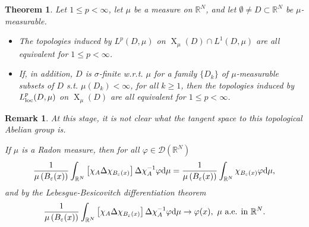 \documentclass{book}
\numberwithin{equation}{section}
\newtheorem{theorem}{Theorem}[section]
\newtheorem{remark}{Remark}[section]
\begin{document}
\begin{enumerate}
    \begin{theorem}
        Let $1\le p < \infty$, let $\mu$ be a measure on $\mathbb{R}^N$, and let $\emptyset\ne D\subset\mathbb{R}^N$ be $\mu$-measurable.
        \begin{itemize}
            \item[(i)] The topologies induced by $L^p(D,\mu)$ on $\operatorname{X}_\mu(D)\cap L^1(D,\mu)$ are all equivalent for $1\le p < \infty$.
            \item[(ii)] If, in addition, $D$ is $\sigma$-finite w.r.t. $\mu$ for a family $\{D_k\}$ of $\mu$-measurable subsets of $D$ s.t. $\mu(D_k) < \infty$, for all $k\ge 1$, then the topologies induced by $L_{\rm loc}^p(D,\mu)$ on $\operatorname{X}_\mu(D)$ are all equivalent for $1\le p < \infty$.
        \end{itemize}
    \end{theorem}

    \begin{remark}
        At this stage, it is not clear what the tangent space to this topological Abelian group is.
        
        If $\mu$ is a Radon measure, then for all $\varphi\in\mathcal{D}(\mathbb{R}^N)$
        \begin{align*}
            \frac{1}{\mu\left(B_\varepsilon(x)\right)}\int_{\mathbb{R}^N} \left[\chi_A\Delta\chi_{B_\varepsilon(x)}\right]\Delta\chi_A^{-1}\varphi{\rm d}\mu = \frac{1}{\mu\left(B_\varepsilon(x)\right)}\int_{\mathbb{R}^N} \chi_{B_\varepsilon(x)}\varphi{\rm d}\mu,
        \end{align*}
        and by the Lebesgue-Besicovitch differentiation theorem
        \begin{align*}
            \frac{1}{\mu\left(B_\varepsilon(x)\right)}\int_{\mathbb{R}^N} \left[\chi_A\Delta\chi_{B_\varepsilon(x)}\right]\Delta\chi_A^{-1}\varphi{\rm d}\mu\to\varphi(x),\ \mu \mbox{ a.e. in } \mathbb{R}^N.
        \end{align*}
    \end{remark}
\end{enumerate}
\end{document}
